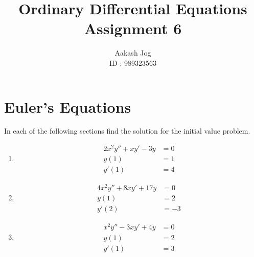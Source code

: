 \documentclass[fleqn, a4paper, 11pt, oneside]{amsart}
\title{Ordinary Differential Equations\\Assignment 6}
\author
{
	Aakash Jog\\
	ID : 989323563
}
\date{\formatdate{25}{5}{2015}}
\theoremstyle{definition}
\theoremstyle{theorem}
\begin{document}
	
\maketitle

\part{Euler's Equations}

\begin{question}
	In each of the following sections find the solution for the initial value problem.
	\begin{enumerate}
		\item
			\begin{align*}
				2 x^2 y'' + x y' - 3 y & = 0 \\
				y(1)                   & = 1 \\
				y'(1)                  & = 4
			\end{align*}
		\item
			\begin{align*}
				4 x^2 y'' + 8 x y' + 17 y & = 0 \\
				y(1)                      & = 2 \\
				y'(2)                     & = -3
			\end{align*}
		\item
			\begin{align*}
				x^2 y'' - 3 x y' + 4 y & = 0 \\
				y(1)                   & = 2 \\
				y'(1)                  & = 3
			\end{align*}
	\end{enumerate}
\end{question}
\end{document}
